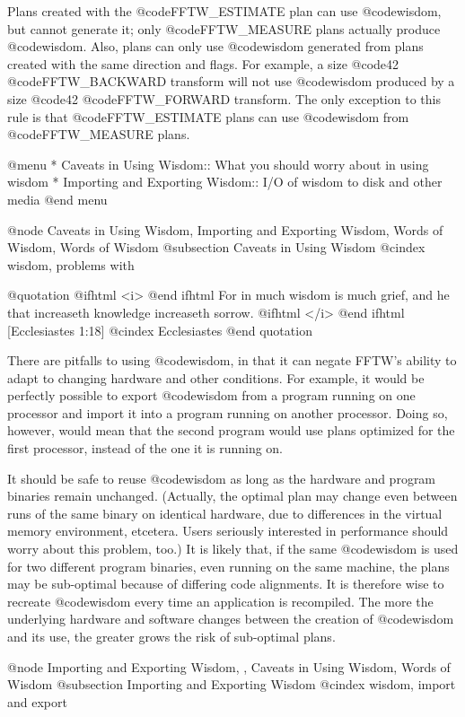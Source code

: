 Plans created with the @code{FFTW_ESTIMATE} plan can use @code{wisdom},
but cannot generate it;  only @code{FFTW_MEASURE} plans actually produce
@code{wisdom}.  Also, plans can only use @code{wisdom} generated from
plans created with the same direction and flags.  For example, a size
@code{42} @code{FFTW_BACKWARD} transform will not use @code{wisdom}
produced by a size @code{42} @code{FFTW_FORWARD} transform.  The only
exception to this rule is that @code{FFTW_ESTIMATE} plans can use
@code{wisdom} from @code{FFTW_MEASURE} plans.

@menu
* Caveats in Using Wisdom::     What you should worry about in using wisdom
* Importing and Exporting Wisdom::  I/O of wisdom to disk and other media
@end menu

@node Caveats in Using Wisdom, Importing and Exporting Wisdom, Words of Wisdom, Words of Wisdom
@subsection Caveats in Using Wisdom
@cindex wisdom, problems with

@quotation
@ifhtml
<i>
@end ifhtml
For in much wisdom is much grief, and he that increaseth knowledge
increaseth sorrow.
@ifhtml
</i>
@end ifhtml
[Ecclesiastes 1:18]
@cindex Ecclesiastes
@end quotation

There are pitfalls to using @code{wisdom}, in that it can negate FFTW's
ability to adapt to changing hardware and other conditions. For example,
it would be perfectly possible to export @code{wisdom} from a program
running on one processor and import it into a program running on another
processor.  Doing so, however, would mean that the second program would
use plans optimized for the first processor, instead of the one it is
running on.

It should be safe to reuse @code{wisdom} as long as the hardware and
program binaries remain unchanged. (Actually, the optimal plan may
change even between runs of the same binary on identical hardware, due
to differences in the virtual memory environment, etcetera.  Users
seriously interested in performance should worry about this problem,
too.)  It is likely that, if the same @code{wisdom} is used for two
different program binaries, even running on the same machine, the plans
may be sub-optimal because of differing code alignments.  It is
therefore wise to recreate @code{wisdom} every time an application is
recompiled.  The more the underlying hardware and software changes
between the creation of @code{wisdom} and its use, the greater grows the
risk of sub-optimal plans.

@node Importing and Exporting Wisdom,  , Caveats in Using Wisdom, Words of Wisdom
@subsection Importing and Exporting Wisdom
@cindex wisdom, import and export

